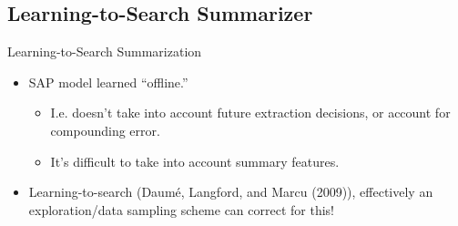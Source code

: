 \subsection{Learning-to-Search Summarizer}

\begin{frame}{Learning-to-Search Summarization}

 \begin{itemize}
   \item SAP model learned ``offline.'' 
   \begin{itemize}
     \item I.e. doesn't take into account future extraction decisions, or 
           account for compounding error.
     \item It's difficult to take into account summary features.
   \end{itemize}
   \item Learning-to-search (Daum\'e, Langford, and Marcu (2009)), effectively an exploration/data sampling scheme
       can correct for this!
 \end{itemize}

    \begin{center}
\end{center}
\end{frame}
